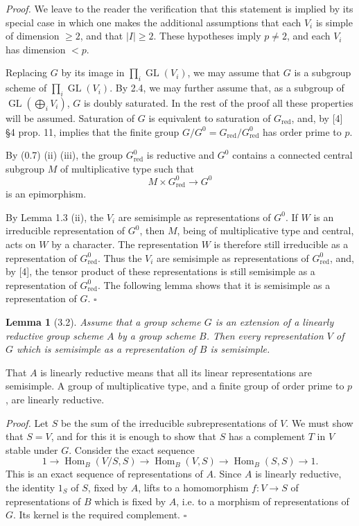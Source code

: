 \documentclass[10pt]{article}
\newcommand{\GL}{\operatorname{GL}}
\newcommand{\red}{\mathrm{red}}
\newcommand{\Hom}{\operatorname{Hom}}
\theoremstyle{deligne}
\newtheorem*{lemma*}{Lemma}
\newenvironment{proofdel}{\textit{Proof.}}{\hfill$\square$}
\begin{document}
\begin{proofdel}
We leave to the reader the verification that this statement is implied by its special case in which one makes the additional assumptions that each \(V_i\) is simple of dimension \(\ge2\), and that \(|I|\ge2\). These hypotheses imply \(p\ne2\), and each \(V_i\) has dimension \(<p\).

Replacing \(G\) by its image in \(\prod_i\GL(V_i)\), we may assume that \(G\) is a subgroup scheme of \(\prod_i\GL(V_i)\). By 2.4, we may further assume that, as a subgroup of \(\GL(\bigoplus_i V_i)\), \(G\) is doubly saturated. In the rest of the proof all these properties will be assumed. Saturation of \(G\) is equivalent to saturation of \(G_{\red}\), and, by [4] \S4 prop. 11, implies that the finite group \(G/G^0=G_{\red}/G^0_{\red}\) has order prime to \(p\).

By (0.7) (ii) (iii), the group \(G^0_{\red}\) is reductive and \(G^0\) contains a connected central subgroup \(M\) of multiplicative type such that
\[
M\times G^0_{\red}\longrightarrow G^0
\]
is an epimorphism.

By Lemma 1.3 (ii), the \(V_i\) are semisimple as representations of \(G^0\). If \(W\) is an irreducible representation of \(G^0\), then \(M\), being of multiplicative type and central, acts on \(W\) by a character. The representation \(W\) is therefore still irreducible as a representation of \(G^0_{\red}\). Thus the \(V_i\) are semisimple as representations of \(G^0_{\red}\), and, by [4], the tensor product of these representations is still semisimple as a representation of \(G^0_{\red}\). The following lemma shows that it is semisimple as a representation of \(G\).
\end{proofdel}

\begin{lemma*}[3.2]
Assume that a group scheme \(G\) is an extension of a linearly reductive group scheme \(A\) by a group scheme \(B\). Then every representation \(V\) of \(G\) which is semisimple as a representation of \(B\) is semisimple.
\end{lemma*}

That \(A\) is linearly reductive means that all its linear representations are semisimple. A group of multiplicative type, and a finite group of order prime to \(p\), are linearly reductive.

\begin{proofdel}
Let \(S\) be the sum of the irreducible subrepresentations of \(V\). We must show that \(S=V\), and for this it is enough to show that \(S\) has a complement \(T\) in \(V\) stable under \(G\). Consider the exact sequence
\[
1\longrightarrow \Hom_B(V/S,S)\longrightarrow \Hom_B(V,S)\longrightarrow \Hom_B(S,S)\longrightarrow 1.
\]
This is an exact sequence of representations of \(A\). Since \(A\) is linearly reductive, the identity \(1_S\) of \(S\), fixed by \(A\), lifts to a homomorphism \(f:V\to S\) of representations of \(B\) which is fixed by \(A\), i.e. to a morphism of representations of \(G\). Its kernel is the required complement.
\end{proofdel}
\end{document}
